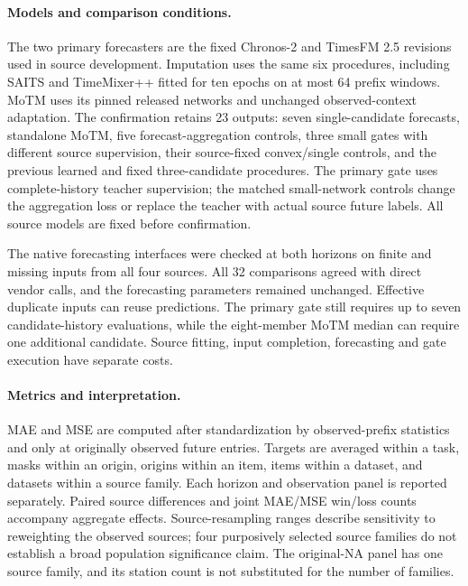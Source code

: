 \paragraph{Models and comparison conditions.}
The two primary forecasters are the fixed Chronos-2 and TimesFM 2.5 revisions used in source development. Imputation uses the same six procedures, including SAITS and TimeMixer++ fitted for ten epochs on at most 64 prefix windows. MoTM uses its pinned released networks and unchanged observed-context adaptation. The confirmation retains 23 outputs: seven single-candidate forecasts, standalone MoTM, five forecast-aggregation controls, three small gates with different source supervision, their source-fixed convex/single controls, and the previous learned and fixed three-candidate procedures. The primary gate uses complete-history teacher supervision; the matched small-network controls change the aggregation loss or replace the teacher with actual source future labels. All source models are fixed before confirmation.

The native forecasting interfaces were checked at both horizons on finite and missing inputs from all four sources. All 32 comparisons agreed with direct vendor calls, and the forecasting parameters remained unchanged. Effective duplicate inputs can reuse predictions. The primary gate still requires up to seven candidate-history evaluations, while the eight-member MoTM median can require one additional candidate. Source fitting, input completion, forecasting and gate execution have separate costs.

\paragraph{Metrics and interpretation.}
MAE and MSE are computed after standardization by observed-prefix statistics and only at originally observed future entries. Targets are averaged within a task, masks within an origin, origins within an item, items within a dataset, and datasets within a source family. Each horizon and observation panel is reported separately. Paired source differences and joint MAE/MSE win/loss counts accompany aggregate effects. Source-resampling ranges describe sensitivity to reweighting the observed sources; four purposively selected source families do not establish a broad population significance claim. The original-NA panel has one source family, and its station count is not substituted for the number of families.
